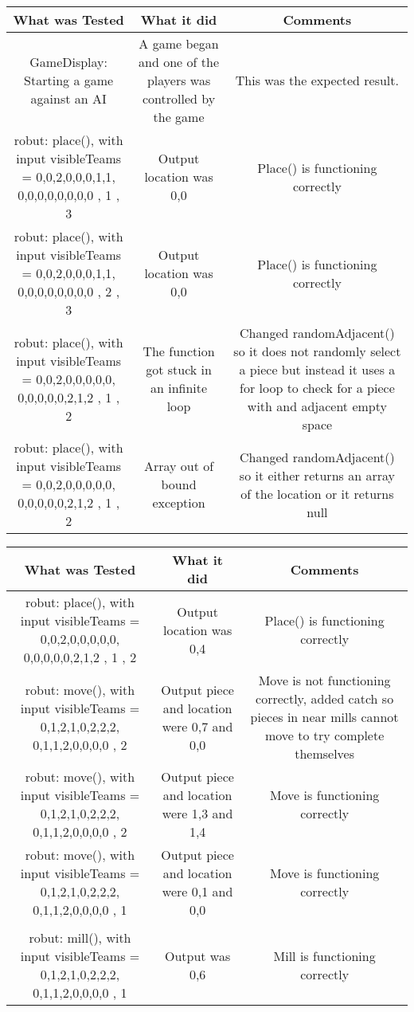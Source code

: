 \documentclass[12pt]{article}
\begin{document}
		\begin{tabularx}{\linewidth}{|C|C|C|}
			\hline 
			What was Tested & What it did & Comments \\
			\hline 
			GameDisplay: Starting a game against an AI & A game began and one of the players was controlled by the game & This was the expected result. \\ \hline 
			robut: place(), with input visibleTeams = {{0,0,2,0,0,0,1,1}, {0,0,0,0,0,0,0,0}} , 1 , 3 & Output location was 0,0 & Place() is functioning correctly \\ \hline 
			robut: place(), with input visibleTeams = {{0,0,2,0,0,0,1,1}, {0,0,0,0,0,0,0,0}} , 2 , 3 & Output location was 0,0 &Place() is functioning correctly \\ \hline 
			robut: place(), with input visibleTeams = {{0,0,2,0,0,0,0,0}, {0,0,0,0,0,2,1,2}} , 1 , 2 & The function got stuck in an infinite loop & Changed randomAdjacent() so it does not randomly select a piece but instead it uses a for loop to check for a piece with and adjacent empty space \\ \hline 
			robut: place(), with input visibleTeams = {{0,0,2,0,0,0,0,0}, {0,0,0,0,0,2,1,2}} , 1 , 2 & Array out of bound exception & Changed randomAdjacent() so it either returns an array of the location or it returns null \\ 	
			 \hline 
		\end{tabularx}	
			\begin{tabularx}{\linewidth}{|C|C|C|}
				\hline 
				What was Tested & What it did & Comments \\
				\hline 
				robut: place(), with input visibleTeams = {{0,0,2,0,0,0,0,0}, {0,0,0,0,0,2,1,2}} , 1 , 2 & Output location was {0,4} & Place() is functioning correctly \\ \hline 
				robut: move(), with input visibleTeams = {{0,1,2,1,0,2,2,2}, {0,1,1,2,0,0,0,0}} , 2 & Output piece and location were {0,7} and {0,0} & Move is not functioning correctly, added catch so pieces in near mills cannot move to try complete themselves \\ \hline 
				robut: move(), with input visibleTeams = {{0,1,2,1,0,2,2,2}, {0,1,1,2,0,0,0,0}} , 2 & Output piece and location were {1,3} and {1,4} & Move is functioning correctly \\ \hline 
				robut: move(), with input visibleTeams = {{0,1,2,1,0,2,2,2}, {0,1,1,2,0,0,0,0}} , 1 & Output piece and location were {0,1} and {0,0} & Move is functioning correctly \\ \hline \\
				robut: mill(), with input visibleTeams = {{0,1,2,1,0,2,2,2}, {0,1,1,2,0,0,0,0}} , 1 & Output was {0,6} & Mill is functioning correctly \\
				 \hline 
				\end{tabularx}
\end{document}
